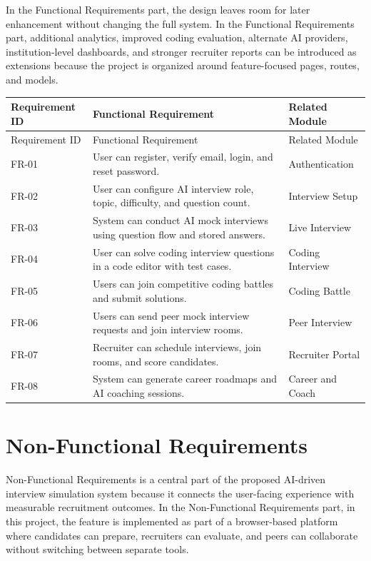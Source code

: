 \documentclass[12pt,a4paper]{report}
\begin{document}
In the Functional Requirements part, the design leaves room for later enhancement without changing the full system. In the Functional Requirements part, additional analytics, improved coding evaluation, alternate AI providers, institution-level dashboards, and stronger recruiter reports can be introduced as extensions because the project is organized around feature-focused pages, routes, and models.


\begin{longtable}{|>{\raggedright\arraybackslash}p{}|>{\raggedright\arraybackslash}p{}|>{\raggedright\arraybackslash}p{}|}
\hline
Requirement ID & Functional Requirement & Related Module \\
\hline
\endfirsthead
\hline
Requirement ID & Functional Requirement & Related Module \\
\hline
\endhead
FR-01 & User can register, verify email, login, and reset password. & Authentication \\
\hline
FR-02 & User can configure AI interview role, topic, difficulty, and question count. & Interview Setup \\
\hline
FR-03 & System can conduct AI mock interviews using question flow and stored answers. & Live Interview \\
\hline
FR-04 & User can solve coding interview questions in a code editor with test cases. & Coding Interview \\
\hline
FR-05 & Users can join competitive coding battles and submit solutions. & Coding Battle \\
\hline
FR-06 & Users can send peer mock interview requests and join interview rooms. & Peer Interview \\
\hline
FR-07 & Recruiter can schedule interviews, join rooms, and score candidates. & Recruiter Portal \\
\hline
FR-08 & System can generate career roadmaps and AI coaching sessions. & Career and Coach \\
\hline
\end{longtable}

\section{Non-Functional Requirements}

Non-Functional Requirements is a central part of the proposed AI-driven interview simulation system because it connects the user-facing experience with measurable recruitment outcomes. In the Non-Functional Requirements part, in this project, the feature is implemented as part of a browser-based platform where candidates can prepare, recruiters can evaluate, and peers can collaborate without switching between separate tools.
\end{document}
